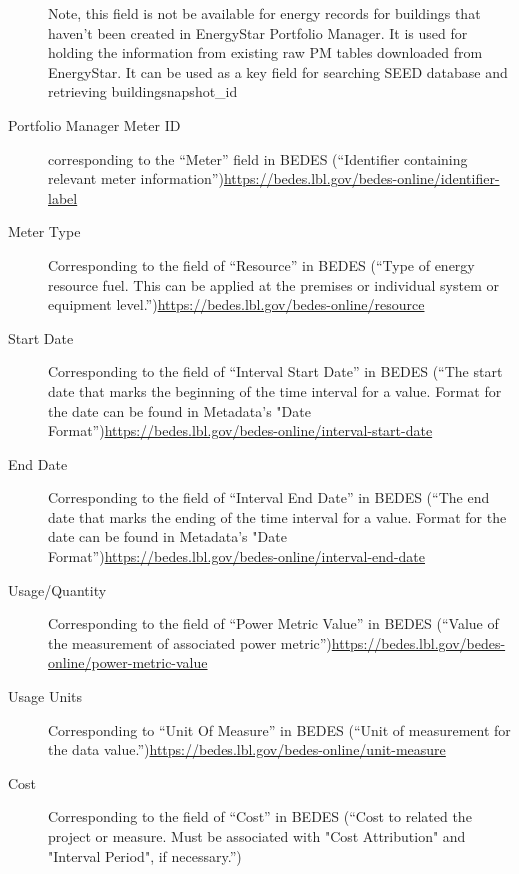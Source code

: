 \documentclass[12pt]{article}
\begin{document}
\begin{description}
  Note, this field is not be available for energy records for
  buildings that haven't been created in EnergyStar Portfolio
  Manager. It is used for holding the information from existing raw PM
  tables downloaded from EnergyStar. It can be used as a key field for
  searching SEED database and retrieving buildingsnapshot\_id
\item[Portfolio Manager Meter ID] corresponding to the ``Meter'' field
  in BEDES (``Identifier containing relevant meter
  information'')\url{https://bedes.lbl.gov/bedes-online/identifier-label}
\item[Meter Type] Corresponding to the field of ``Resource'' in BEDES
  (``Type of energy resource fuel. This can be applied at the premises
  or individual system or equipment
  level.'')\url{https://bedes.lbl.gov/bedes-online/resource}
\item[Start Date] Corresponding to the field of ``Interval Start
  Date'' in BEDES (``The start date that marks the beginning of the
  time interval for a value. Format for the date can be found in
  Metadata's "Date
  Format'')\url{https://bedes.lbl.gov/bedes-online/interval-start-date}
\item[End Date] Corresponding to the field of ``Interval End Date'' in
  BEDES (``The end date that marks the ending of the time interval for
  a value. Format for the date can be found in Metadata's "Date
  Format'')\url{https://bedes.lbl.gov/bedes-online/interval-end-date}
\item[Usage/Quantity] Corresponding to the field of ``Power Metric
  Value'' in BEDES (``Value of the measurement of associated power
  metric'')\url{https://bedes.lbl.gov/bedes-online/power-metric-value}
\item[Usage Units] Corresponding to ``Unit Of Measure'' in BEDES
  (``Unit of measurement for the data
  value.'')\url{https://bedes.lbl.gov/bedes-online/unit-measure}
\item[Cost] Corresponding to the field of ``Cost'' in BEDES (``Cost to
  related the project or measure. Must be associated with "Cost
  Attribution" and "Interval Period", if necessary.'')
\end{description}
\end{document}
